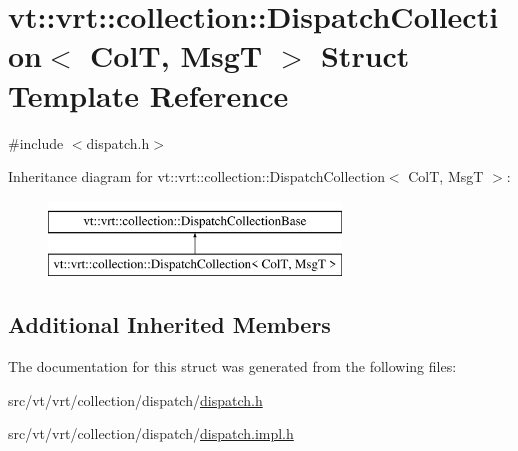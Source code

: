 \hypertarget{structvt_1_1vrt_1_1collection_1_1_dispatch_collection}{}\section{vt\+:\+:vrt\+:\+:collection\+:\+:Dispatch\+Collection$<$ ColT, MsgT $>$ Struct Template Reference}
\label{structvt_1_1vrt_1_1collection_1_1_dispatch_collection}


{\ttfamily \#include $<$dispatch.\+h$>$}

Inheritance diagram for vt\+:\+:vrt\+:\+:collection\+:\+:Dispatch\+Collection$<$ ColT, MsgT $>$\+:\begin{figure}[H]
\begin{center}
\leavevmode
\includegraphics[height=2.000000cm]{structvt_1_1vrt_1_1collection_1_1_dispatch_collection}
\end{center}
\end{figure}
\subsection*{Additional Inherited Members}


The documentation for this struct was generated from the following files\+:\begin{DoxyCompactItemize}
\item 
src/vt/vrt/collection/dispatch/\hyperlink{vrt_2collection_2dispatch_2dispatch_8h}{dispatch.\+h}\item 
src/vt/vrt/collection/dispatch/\hyperlink{vrt_2collection_2dispatch_2dispatch_8impl_8h}{dispatch.\+impl.\+h}\end{DoxyCompactItemize}
